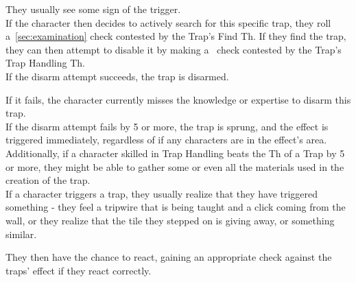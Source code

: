 They usually see some sign of the trigger.\\
If the character then decides to actively search for this specific trap, they roll a~\ref{sec:examination} check contested by the Trap's Find Th.
If they find the trap, they can then attempt to disable it by making a~ check contested by the Trap's Trap Handling Th.\\
If the disarm attempt succeeds, the trap is disarmed.

If it fails, the character currently misses the knowledge or expertise to disarm this trap.\\
If the disarm attempt fails by 5 or more, the trap is sprung, and the effect is triggered immediately, regardless of if any characters are in the effect's area.\\
Additionally, if a character skilled in Trap Handling beats the Th of a Trap by 5 or more, they might be able to gather some or even all the materials used in the creation of the trap.\\
If a character triggers a trap, they usually realize that they have triggered something - they feel a tripwire that is being taught and a click coming from the wall, or they realize that the tile they stepped on is giving away, or something similar.

They then have the chance to react, gaining an appropriate check against the traps' effect if they react correctly.\\

